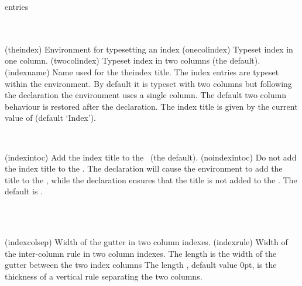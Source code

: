 

\begin{syntax}
 entries  \\
\cmd{\onecolindex} \cmd{\twocolindex} \\
\cmd{\indexname} \\
\end{syntax}
\glossary(theindex)%
  {}%
  {Environment for typesetting an index}
\glossary(onecolindex)%
  {}%
  {Typeset index in one column.}
\glossary(twocolindex)%
  {}%
  {Typeset index in two columns (the default).}
\glossary(indexname)%
  {}%
  {Name used for the theindex title.}
The index entries are typeset within the  
environment. By default it is typeset with two 
columns
but following the \cmd{\onecolindex} declaration the environment
uses a single column. 
The default two column behaviour is restored
after the \cmd{\twocolindex} declaration.
The index title is given by the current value of 
\cmd{\indexname} (default `Index').

\begin{syntax}
\cmd{\indexintoc} \cmd{\noindexintoc} \\
\end{syntax}
\glossary(indexintoc)%
  {}%
  {Add the index title to the \prtoc\ (the default).}
\glossary(noindexintoc)%
  {}%
  {Do not add the index title to the \prtoc.}
The declaration \cmd{\indexintoc} will cause the 
environment to add the title to the \toc, 
while the declaration
\cmd{\noindexintoc} ensures that the title is not added to the \toc. 
The default is \cmd{\indexintoc}.

\begin{syntax}
\lnc{\indexcolsep} \\
\lnc{\indexrule} \\
\end{syntax}
\glossary(indexcolsep)%
  {}%
  {Width of the gutter in two column indexes.}
\glossary(indexrule)%
  {}%
  {Width of the inter-column rule in two column indexes.}
The length \lnc{\indexcolsep} is the width of the gutter between the two
index columns
The length \lnc{\indexrule}, default
value 0pt, is the thickness of a vertical rule separating the two columns.


